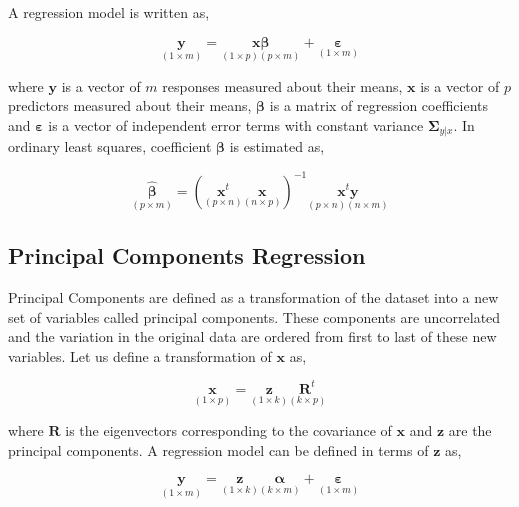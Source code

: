 \documentclass[12pt,3p,authoryear]{elsarticle}
\begin{document}
A regression model is written as,

\begin{equation}
\underset{(1\times m)}{\mathbf{y}} =
  \underset{(1\times p)(p\times m)}
    {\mathbf{x}\boldsymbol{\beta}} +
  \underset{(1 \times m)}{\boldsymbol{\varepsilon}}
\label{eq:reg-model}
\end{equation}

where \(\mathbf{y}\) is a vector of \(m\) responses measured about their
means, \(\mathbf{x}\) is a vector of \(p\) predictors measured about
their means, \(\boldsymbol{\beta}\) is a matrix of regression
coefficients and \(\boldsymbol{\varepsilon}\) is a vector of independent
error terms with constant variance \(\boldsymbol{\Sigma}_{y|x}\). In
ordinary least squares, coefficient \(\boldsymbol{\beta}\) is estimated
as,

\begin{equation}
\underset{(p\times m)}{\boldsymbol{\hat{\beta}}} =
  \left(\underset{(p\times n)}{\mathbf{x}^t}
  \underset{(n\times p)}{\mathbf{x}}\right)^{-1}
  \underset{(p \times n)(n \times m)}{\mathbf{x}^t\mathbf{y}}
\label{eq:reg-beta}
\end{equation}

\subsection{Principal Components
Regression}\label{principal-components-regression}

Principal Components are defined as a transformation of the dataset into
a new set of variables called principal components. These components are
uncorrelated and the variation in the original data are ordered from
first to last of these new variables. Let us define a transformation of
\(\mathbf{x}\) as,

\begin{equation}
\underset{(1\times p)}{\mathbf{x}} =
  \underset{(1 \times k)}{\mathbf{z}}
  \underset{(k \times p)}{\mathbf{R}^t}
\label{eq:x2z}
\end{equation}

where \(\mathbf{R}\) is the eigenvectors corresponding to the covariance
of \(\mathbf{x}\) and \(\mathbf{z}\) are the principal components. A
regression model can be defined in terms of \(\mathbf{z}\) as,

\begin{equation}
\underset{(1 \times m)}{\mathbf{y}} =
  \underset{(1 \times k)}{\mathbf{z}}
    \underset{(k \times m)}{\boldsymbol{\alpha}} +
  \underset{(1 \times m)}{\boldsymbol{\varepsilon}}
\label{eq:latent-model}
\end{equation}
\end{document}
